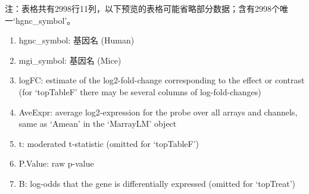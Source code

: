 \documentclass[
]{article}
\providecommand{\tightlist}{%
  \setlength{\itemsep}{0pt}\setlength{\parskip}{0pt}}
\begin{document}
\begin{center}\begin{tcolorbox}[colback=gray!10, colframe=gray!50, width=0.9\linewidth, arc=1mm, boxrule=0.5pt]注：表格共有2998行11列，以下预览的表格可能省略部分数据；含有2998个唯一`hgnc\_symbol'。
\end{tcolorbox}
\end{center}
\begin{center}\begin{tcolorbox}[colback=gray!10, colframe=gray!50, width=0.9\linewidth, arc=1mm, boxrule=0.5pt]\begin{enumerate}\tightlist
\item hgnc\_symbol:  基因名 (Human)
\item mgi\_symbol:  基因名 (Mice)
\item logFC:  estimate of the log2-fold-change corresponding to the effect or contrast (for ‘topTableF’ there may be several columns of log-fold-changes)
\item AveExpr:  average log2-expression for the probe over all arrays and channels, same as ‘Amean’ in the ‘MarrayLM’ object
\item t:  moderated t-statistic (omitted for ‘topTableF’)
\item P.Value:  raw p-value
\item B:  log-odds that the gene is differentially expressed (omitted for ‘topTreat’)
\end{enumerate}\end{tcolorbox}
\end{center}
\end{document}
